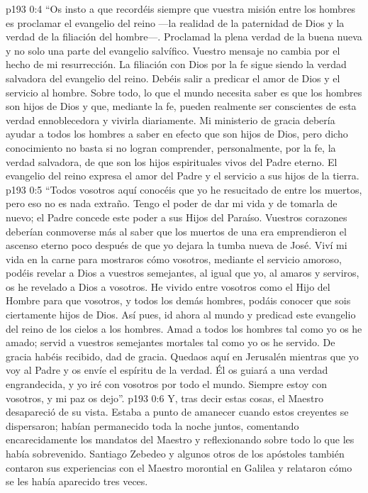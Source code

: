 \vs p193 0:4 “Os insto a que recordéis siempre que vuestra misión entre los hombres es proclamar el evangelio del reino ---la realidad de la paternidad de Dios y la verdad de la filiación del hombre---. Proclamad la plena verdad de la buena nueva y no solo una parte del evangelio salvífico. Vuestro mensaje no cambia por el hecho de mi resurrección. La filiación con Dios por la fe sigue siendo la verdad salvadora del evangelio del reino. Debéis salir a predicar el amor de Dios y el servicio al hombre. Sobre todo, lo que el mundo necesita saber es que los hombres son hijos de Dios y que, mediante la fe, pueden realmente ser conscientes de esta verdad ennoblecedora y vivirla diariamente. Mi ministerio de gracia debería ayudar a todos los hombres a saber en efecto que son hijos de Dios, pero dicho conocimiento no basta si no logran comprender, personalmente, por la fe, la verdad salvadora, de que son los hijos espirituales vivos del Padre eterno. El evangelio del reino expresa el amor del Padre y el servicio a sus hijos de la tierra.
\vs p193 0:5 “Todos vosotros aquí conocéis que yo he resucitado de entre los muertos, pero eso no es nada extraño. Tengo el poder de dar mi vida y de tomarla de nuevo; el Padre concede este poder a sus Hijos del Paraíso. Vuestros corazones deberían conmoverse más al saber que los muertos de una era emprendieron el ascenso eterno poco después de que yo dejara la tumba nueva de José. Viví mi vida en la carne para mostraros cómo vosotros, mediante el servicio amoroso, podéis revelar a Dios a vuestros semejantes, al igual que yo, al amaros y serviros, os he revelado a Dios a vosotros. He vivido entre vosotros como el Hijo del Hombre para que vosotros, y todos los demás hombres, podáis conocer que sois ciertamente hijos de Dios. Así pues, id ahora al mundo y predicad este evangelio del reino de los cielos a los hombres. Amad a todos los hombres tal como yo os he amado; servid a vuestros semejantes mortales tal como yo os he servido. De gracia habéis recibido, dad de gracia. Quedaos aquí en Jerusalén mientras que yo voy al Padre y os envíe el espíritu de la verdad. Él os guiará a una verdad engrandecida, y yo iré con vosotros por todo el mundo. Siempre estoy con vosotros, y mi paz os dejo”.
\vs p193 0:6 \pc Y, tras decir estas cosas, el Maestro desapareció de su vista. Estaba a punto de amanecer cuando estos creyentes se dispersaron; habían permanecido toda la noche juntos, comentando encarecidamente los mandatos del Maestro y reflexionando sobre todo lo que les había sobrevenido. Santiago Zebedeo y algunos otros de los apóstoles también contaron sus experiencias con el Maestro morontial en Galilea y relataron cómo se les había aparecido tres veces.
